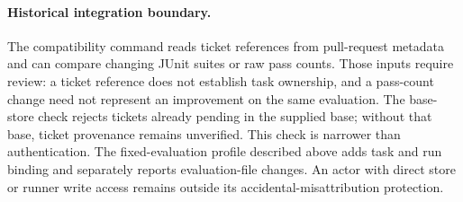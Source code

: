 \paragraph{Historical integration boundary.}
The compatibility command reads ticket references from pull-request metadata
and can compare changing JUnit suites or raw pass counts. Those inputs require
review: a ticket reference does not establish task ownership, and a pass-count
change need not represent an improvement on the same evaluation. The base-store
check rejects tickets already pending in the supplied base; without that base,
ticket provenance remains unverified. This check is narrower than authentication.
The fixed-evaluation profile described above adds task and run binding and
separately reports evaluation-file changes. An actor with direct store or runner
write access remains outside its accidental-misattribution protection.
